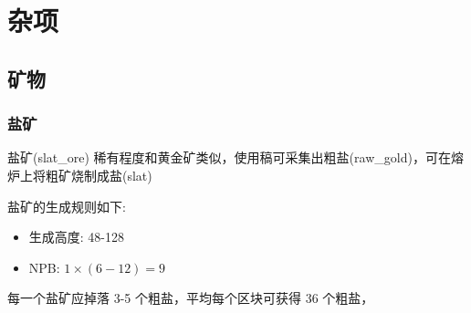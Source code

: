 \section{杂项}

\subsection{矿物}
\subsubsection{盐矿}

盐矿(slat\_ore) 稀有程度和黄金矿类似，使用稿可采集出粗盐(raw\_gold)，可在熔炉上将粗矿烧制成盐(slat)

盐矿的生成规则如下:
\begin{itemize}
    \item 生成高度: 48-128
    \item NPB: $1 \times (6-12) = 9$
\end{itemize}

每一个盐矿应掉落 3-5 个粗盐，平均每个区块可获得 36 个粗盐，


\newpage